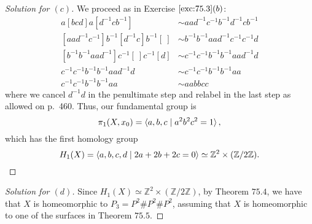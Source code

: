 \documentclass[12pt]{article}
\theoremstyle{remark}
\begin{document}
\begin{proof}[Solution for $(c)$]
  We proceed as in Exercise $\ref{exc:75.3}(b)$:
  \begin{align*}
    [~]a[bcd]a[d^{-1}cb^{-1}] &\sim aad^{-1}c^{-1}b^{-1}d^{-1}cb^{-1}\\
    [aad^{-1}c^{-1}]b^{-1}[d^{-1}c]b^{-1}[~] &\sim b^{-1}b^{-1}aad^{-1}c^{-1}c^{-1}d\\
    [b^{-1}b^{-1}aad^{-1}]c^{-1}[~]c^{-1}[d] &\sim c^{-1}c^{-1}b^{-1}b^{-1}aad^{-1}d\\
    c^{-1}c^{-1}b^{-1}b^{-1}aad^{-1}d &\sim c^{-1}c^{-1}b^{-1}b^{-1}aa\\
    c^{-1}c^{-1}b^{-1}b^{-1}aa &\sim aabbcc
  \end{align*}
  where we cancel $d^{-1}d$ in the penultimate step and relabel in the last step as allowed on p.~460. Thus, our fundamental group is
  \begin{equation*}
    \pi_1(X,x_0) = \braket{a,b,c \mid a^2b^2c^2 = 1},
  \end{equation*}
  which has the first homology group
  \begin{equation*}
    H_1(X) = \braket{a,b,c,d \mid 2a + 2b + 2c = 0} \simeq \mathbb{Z}^2 \times
    (\mathbb{Z}/2\mathbb{Z}).\qedhere
  \end{equation*}
\end{proof}
\begin{proof}[Solution for $(d)$]
  Since $H_1(X) \simeq \mathbb{Z}^2 \times (\mathbb{Z}/2\mathbb{Z})$, by Theorem $75.4$, we have that $X$ is homeomorphic to $P_3 = P^2 \# P^2 \# P^2$, assuming that $X$ is homeomorphic to one of the surfaces in Theorem $75.5$.
\end{proof}

\cleardoublepage
{}
{\footnotesize\tableofcontents}
\end{document}
